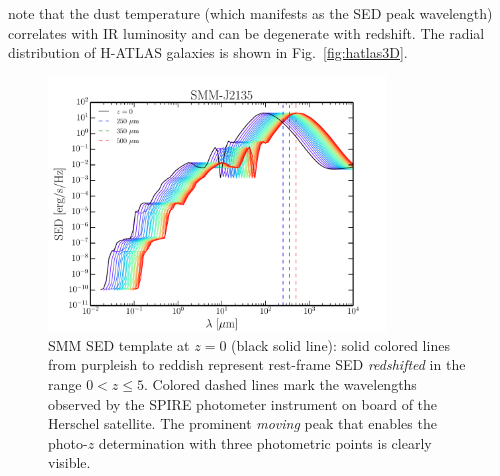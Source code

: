 note that the dust temperature (which manifests as the \gls{SED} peak wavelength) correlates with \gls{IR} luminosity and can be degenerate with redshift. The radial distribution of H-ATLAS galaxies is shown in Fig.~\eqref{fig:hatlas3D}.


\begin{figure} %
\centering %
\includegraphics[width=0.8\textwidth]{Chapter2/Images/SED_zs}
\caption{SMM SED template  at $z=0$ (black solid line): solid colored lines from purpleish to reddish represent rest-frame SED \emph{redshifted} in the range $0 < z \le 5$. Colored dashed lines mark the wavelengths observed by the SPIRE photometer instrument on board of the Herschel satellite. The prominent \emph{moving} peak that enables the photo-$z$ determination with three photometric points is clearly visible.  \label{fig:SED_SMM}}
\end{figure}




